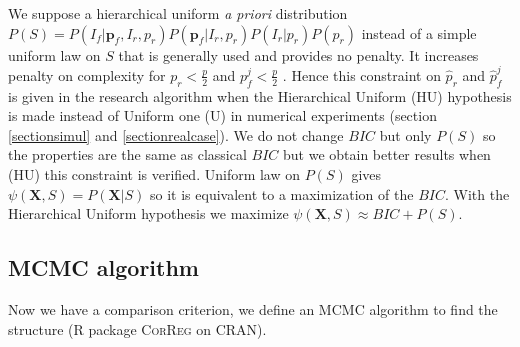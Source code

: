 \documentclass[11pt,a4paper]{article}
\begin{document}
	 We suppose a hierarchical uniform {\it a priori} distribution $P(S)=P(I_f | \boldsymbol{p}_f,I_r,p_r)P(\boldsymbol{p}_f|I_r,p_r)P(I_r|p_r)P(p_r)$  instead of a simple uniform law on $S$ that is generally used and provides no penalty.
	It increases penalty on complexity for $p_r<\frac{p}{2}$ and $p_f^j<\frac{p}{2}$ . Hence %
	this constraint on $\hat{p}_r$ and $\hat{p}_f^j$ is given in the research algorithm when the Hierarchical Uniform (HU) hypothesis is made instead of Uniform one (U) in numerical experiments (section \ref{sectionsimul} and \ref{sectionrealcase}).
		We do not change $BIC$ but only $P(S)$ so the properties are the same as classical $BIC$ but we obtain better results when (HU) this constraint is verified. Uniform law on $P(S)$ gives $\psi(\boldsymbol{X},S)=P(\boldsymbol{X}|S)$ so it is equivalent to a maximization of the $BIC$. With the Hierarchical Uniform hypothesis we maximize $\psi(\boldsymbol{X},S)\approx BIC + P(S)$.

%	


\subsection{MCMC algorithm}
	Now we have a comparison criterion, we define an MCMC algorithm to find the structure (R package \textsc{CorReg} on CRAN). 
\end{document}
